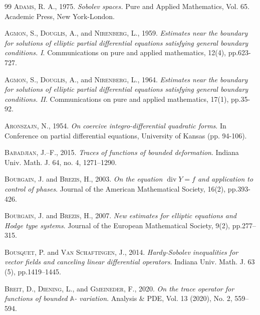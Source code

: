 \documentclass[a4paper,10pt]{amsart}
\newcommand{\di}{\operatorname{div}}
\numberwithin{equation}{section}
\theoremstyle{remark}
\numberwithin{equation}{section}
\begin{document}
	
	
	
	
	
	
	\begin{thebibliography}{99}
		 \textsc{Adams, R. A.}, 1975. \emph{Sobolev spaces. } Pure and Applied Mathematics, Vol. 65. Academic Press, New York-London.
		
		 \textsc{Agmon, S.}, \textsc{Douglis, A.}, and \textsc{Nirenberg, L.}, 1959. \emph{Estimates near the boundary
			for solutions of elliptic partial differential equations satisfying general boundary conditions. I}. Communications on pure and applied mathematics, 12(4), pp.623-727.
		
		 \textsc{Agmon, S.}, \textsc{Douglis, A.}, and \textsc{Nirenberg, L.}, 1964. \emph{Estimates near the boundary for solutions of elliptic partial differential equations satisfying general boundary
			conditions. II}. Communications on pure and applied mathematics, 17(1), pp.35-92.
		
		 \textsc{Aronszajn, N.}, 1954. \emph{On coercive integro-differential quadratic forms}. In Conference on partial differential equations, University of Kansas (pp. 94-106).
		
		 \textsc{Babadjian, J.--F.}, 2015. \emph{Traces of functions of bounded deformation}. Indiana Univ. Math. J. 64, no. 4, 1271--1290.
		
		 \textsc{Bourgain, J.} and \textsc{Brezis, H.}, 2003. \emph{On the equation $\di Y=f$ and application to control of phases}. Journal of the American Mathematical Society, 16(2), pp.393-426.
		
		 \textsc{Bourgain, J.} and \textsc{Brezis, H.}, 2007. \emph{New estimates for elliptic equations and Hodge type systems}. Journal of the European Mathematical Society, 9(2), pp.277--315.
		
		 \textsc{Bousquet, P.} and \textsc{Van Schaftingen, J.}, 2014. \emph{Hardy-Sobolev inequalities for vector fields and canceling linear differential operators}. Indiana Univ. Math. J. 63 (5), pp.1419--1445.
		
		
		 \textsc{Breit, D.}, \textsc{Diening, L.}, and \textsc{Gmeineder, F.}, 2020. \emph{On the trace operator for functions of bounded $\mathbb{A}$-
			variation}. Analysis \& PDE, Vol. 13 (2020), No. 2, 559--594.
		

\end{thebibliography}
\end{document}
